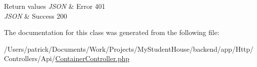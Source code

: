 \begin{DoxyRetVals}{Return values}
{\em J\+S\+ON} & Error 401 \\
\hline
{\em J\+S\+ON} & Success 200 \\
\hline
\end{DoxyRetVals}


The documentation for this class was generated from the following file\+:\begin{DoxyCompactItemize}
\item 
/\+Users/patrick/\+Documents/\+Work/\+Projects/\+My\+Student\+House/backend/app/\+Http/\+Controllers/\+Api/\mbox{\hyperlink{_container_controller_8php}{Container\+Controller.\+php}}\end{DoxyCompactItemize}
